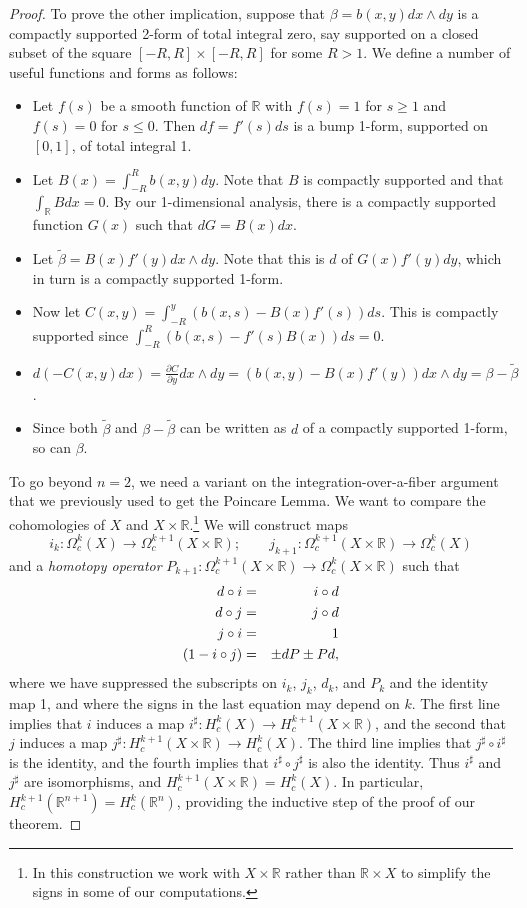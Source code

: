 \documentclass[12pt]{amsbook}
\newcommand{\R}{{\mathbb R}}
\theoremstyle{definition}
\begin{document}
\begin{proof}
To prove the other implication, suppose that $\beta = b(x,y) dx \wedge
dy$ is a compactly supported 2-form of total integral zero, say
supported on a closed subset of the square $[-R,R] \times [-R,R]$ for
some $R>1$.  We define a number of useful functions and forms as
follows:
\begin{itemize}
\item Let $f(s)$ be a smooth function of $\R$ with $f(s)=1$ for $s \ge
  1$ and $f(s)= 0$ for $s \le 0$. Then $df = f'(s) ds$ is a bump 1-form,
  supported on $[0,1]$, of total integral 1.
\item Let $B(x) = \int_{-R}^R b(x,y) dy$. Note that $B$ is compactly
  supported and that $\int_\R B dx = 0$. By our 1-dimensional analysis,
there is a
  compactly supported function $G(x)$ such that $dG=B(x)dx$.
\item Let $\tilde \beta =B(x) f'(y) dx \wedge dy$. Note that this is 
$d$ of $G(x) f'(y) dy$, which in turn is a compactly supported
1-form. 
\item Now let $C(x,y) = \int_{-R}^y (b(x,s) - B(x) f'(s)) ds$. This is 
compactly supported since $\int_{-R}^R (b(x,s) -f'(s)B(x)) ds = 0$. 
\item $d (-C(x,y) dx) = \frac{\partial C}{\partial y} dx \wedge dy 
= (b(x,y)-B(x)f'(y)) dx \wedge dy = \beta - \tilde \beta$.  
\item Since both $\tilde \beta$ and $\beta - \tilde \beta$ can be written 
as $d$ of a compactly supported 1-form, so can $\beta$. 
\end{itemize}

To go beyond $n=2$, we need a variant on the integration-over-a-fiber
argument that we previously used to get the Poincare Lemma. 
We want to compare the cohomologies of $X$ and $X \times \R$.\footnote{In this
construction we work with $X \times \R$ rather than $\R \times X$ to simplify
the signs in some of our computations.} We will
construct maps
$$i_k: \Omega^k_c(X) \to \Omega^{k+1}_c(X \times \R); \qquad j_{k+1}: \Omega_c^{k+1}(X \times \R) \to \Omega^k_c(X)$$
and a {\em homotopy operator} $P_{k+1}: \Omega^{k+1}_c(X \times \R) \to \Omega^k_c(X \times \R)$ such that 
\begin{eqnarray}
d \circ i &=&  i \circ d \cr
d \circ j & = &  j \circ d \cr 
j \circ i & = & 1 \cr 
(1-i\circ j) &=& \pm dP  \pm Pd,
\end{eqnarray}
where we have suppressed the subscripts on $i_k$, $j_k$, $d_k$, and
$P_k$ and the identity map 1, and where the signs in the last equation
may depend on $k$.  The first line implies that $i$ induces a map
$i^\sharp: H^k_c(X) \to H^{k+1}_c(X \times \R)$, and the second that
$j$ induces a map $j^\sharp: H^{k+1}_c(X \times \R) \to H^k_c(X)$. The
third line implies that $j^\sharp \circ i^\sharp$ is the identity, and
the fourth implies that $i^\sharp \circ j^\sharp$ is also the
identity. Thus $i^\sharp$ and $j^\sharp$ are isomorphisms, and
$H^{k+1}_c(X \times \R) = H^k_c(X)$. In particular,
$H^{k+1}_c(\R^{n+1}) = H^k_c(\R^n)$, providing the inductive step of
the proof of our theorem.


\end{proof}
\end{document}

